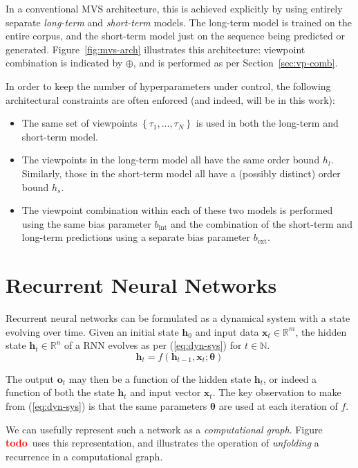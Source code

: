 \documentclass[12pt,a4paper,twoside,openright]{report}
\newcommand{\set}[1]{ \left\{ #1 \right\} }
\newcommand{\vect}[1]{\boldsymbol{\mathbf{#1}}}
\newcommand{\todo}{\textcolor{red}{\textbf{todo}~}}
\begin{document}
In a conventional MVS architecture, this is achieved explicitly by using
entirely separate \emph{long-term} and \emph{short-term} models. The long-term
model is trained on the entire corpus, and the short-term model just on the
sequence being predicted or generated. Figure~\ref{fig:mvs-arch} illustrates
this architecture: viewpoint combination is indicated by $\oplus$, and is
performed as per Section~\ref{sec:vp-comb}.

In order to keep the number of hyperparameters under control, the following
architectural constraints are often enforced (and indeed, will be in this work):
\begin{itemize}
  \item The same set of viewpoints $\set{\tau_1, \ldots, \tau_N}$ is used in both
    the long-term and short-term model. 
  \item The viewpoints in the long-term model all have the same order bound
    $h_l$. Similarly, those in the short-term model all have a (possibly
    distinct) order bound $h_s$.
  \item The viewpoint combination within each of these two models is performed
    using the same bias parameter $b_{\mathrm{int}}$ and the combination of the
    short-term and long-term predictions using a separate bias parameter
    $b_{\mathrm{ext}}$.
\end{itemize}

\section{Recurrent Neural Networks}\label{sec:rnn-intro}

Recurrent neural networks can be formulated as a dynamical system with a state
evolving over time. Given an initial state $\vect{h}_0$ and input data
$\vect{x}_t \in \mathbb{R}^m$, the hidden state $\vect{h}_t \in \mathbb{R}^n$ of
a RNN evolves as per (\ref{eq:dyn-sys}) for $t \in \mathbb{N}$.
\begin{equation}
  \vect{h}_t = f(\vect{h}_{t-1}, \vect{x}_t; \vect{\theta})
  \label{eq:dyn-sys}
\end{equation} 

The output
$\vect{o}_t$ may then be a function of the hidden state $\vect{h}_t$, or indeed
a function of both the state $\vect{h}_t$ and input vector $\vect{x}_t$. The key
observation to make from (\ref{eq:dyn-sys}) is that the same parameters
$\vect{\theta}$ are used at each iteration of $f$. 

We can usefully represent such a network as a \emph{computational graph}. Figure
\todo uses this representation, and illustrates the operation of
\emph{unfolding} a recurrence in a computational graph.
\end{document}

